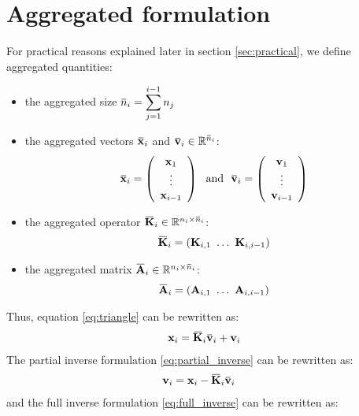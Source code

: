 \documentclass[12pt]{scrartcl}
\newcommand{\overbar}[1]{\mkern 1.5mu\overline{\mkern-1.5mu#1\mkern-1.5mu}\mkern 1.5mu}
\begin{document}
\section{Aggregated formulation}
For practical reasons explained later in section \ref{sec:practical}, we define aggregated quantities:
\begin{itemize}
\item the aggregated size $\displaystyle \overbar{n}_i = \sum_{j=1}^{i-1} n_j$
\item the aggregated vectors $\overbar{\mathbf{x}}_i$ and $\overbar{\mathbf{v}}_i \in \mathbb{R}^{\overbar{n}_i}$:
\begin{align}
\overbar{\mathbf{x}}_i = \left(\begin{array}{c}
\mathbf{x}_1 \\
\vdots \\
\mathbf{x}_{i-1}
\end{array}
\right) \ \text{ and } \ \overbar{\mathbf{v}}_i = \left(\begin{array}{c}
\mathbf{v}_1 \\
\vdots \\
\mathbf{v}_{i-1}
\end{array}
\right)
\end{align}
\item the aggregated operator $\overbar{\mathbf{K}}_i \in \mathbb{R}^{n_i \times \overbar{n}_i}$:
\begin{align}
\overbar{\mathbf{K}}_i = \left(\mathbf{K}_{i,1} \ \dots \ \mathbf{K}_{i,i-1}\right)
\end{align}
\item the aggregated matrix $\overbar{\mathbf{A}}_i \in \mathbb{R}^{n_i \times \overbar{n}_i}$:
\begin{align}
\overbar{\mathbf{A}}_i = \left(\mathbf{A}_{i,1} \ \dots \ \mathbf{A}_{i,i-1}\right)
\end{align}
\end{itemize}
Thus, equation \eqref{eq:triangle} can be rewritten as:
\begin{align}
\label{eq:triangle_aggregated}
\mathbf{x}_i = \overbar{\mathbf{K}}_i \overbar{\mathbf{v}}_i + \mathbf{v}_i
\end{align}
The partial inverse formulation \eqref{eq:partial_inverse} can be rewritten as:
\begin{align}
\label{eq:partial_inverse_aggregated}
\mathbf{v}_i  & = \mathbf{x}_i - \overbar{\mathbf{K}}_i \overbar{\mathbf{v}}_i
\end{align}
and the full inverse formulation \eqref{eq:full_inverse} can be rewritten as:
\end{document}

